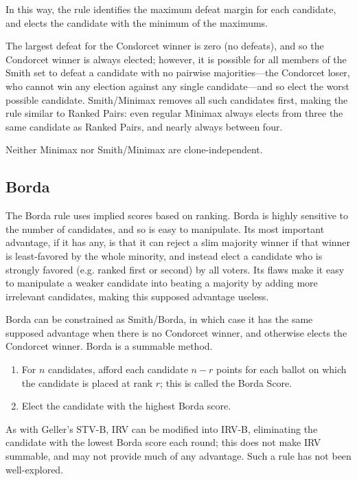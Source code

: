 In this way, the rule identifies the maximum defeat margin for each candidate, and elects the candidate with the minimum of the maximums.

The largest defeat for the Condorcet winner is zero (no defeats), and so the Condorcet winner is always elected; however, it is possible for all members of the Smith set to defeat a candidate with no pairwise majorities—the Condorcet loser, who cannot win any election against any single candidate—and so elect the worst possible candidate.  Smith/Minimax removes all such candidates first, making the rule similar to Ranked Pairs:  even regular Minimax always elects from three the same candidate as Ranked Pairs, and nearly always between four.

Neither Minimax nor Smith/Minimax are clone-independent.

\subsection{Borda}

The Borda rule uses implied scores based on ranking.  Borda is highly sensitive to the number of candidates, and so is easy to manipulate.  Its most important advantage, if it has any, is that it can reject a slim majority winner if that winner is least-favored by the whole minority, and instead elect a candidate who is strongly favored (e.g. ranked first or second) by all voters.  Its flaws make it easy to manipulate a weaker candidate into beating a majority by adding more irrelevant candidates, making this supposed advantage useless.

Borda can be constrained as Smith/Borda, in which case it has the same supposed advantage when there is no Condorcet winner, and otherwise elects the Condorcet winner.  Borda is a summable method.

\begin{enumerate}
    \item For $n$ candidates, afford each candidate $n-r$ points for each ballot on which the candidate is placed at rank $r$; this is called the Borda Score.

    \item Elect the candidate with the highest Borda score.
\end{enumerate}

As with Geller's STV-B, IRV can be modified into IRV-B, eliminating the candidate with the lowest Borda score each round; this does not make IRV summable, and may not provide much of any advantage.  Such a rule has not been well-explored.

